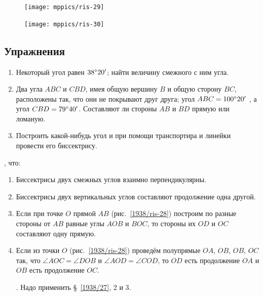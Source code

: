 \documentclass[oneside]{book}
\begin{document}
\begin{figure}
\begin{minipage}{.48\textwidth}
\centering
\texttt{[image: mppics/ris-29]}
\caption{}\label{1938/ris-29}
\end{minipage}\hfill
\begin{minipage}{.48\textwidth}
\centering
\texttt{[image: mppics/ris-30]}
\caption{}\label{1938/ris-30}
\end{minipage}
\end{figure}


\subsection*{Упражнения}

\begin{enumerate}

 \item
Некоторый угол равен $38\degree 20'$;
найти величину смежного с ним угла.

 \item
Два угла $ABC$ и $CBD$, имея общую вершину $B$ и общую сторону $BC$, расположены так, что они не покрывают друг друга;
угол $ABC = 100\degree20'$ , а угол $CBD = 79\degree 40'$.
Составляют ли стороны $AB$ и $BD$ прямую или ломаную.

 \item
Построить какой-нибудь угол и при помощи транспортира и линейки провести его биссектрису.

\end{enumerate}

, что:

\begin{enumerate}[resume]
 \item
Биссектрисы двух смежных углов взаимно перпендикулярны.

 \item
Биссектрисы двух вертикальных углов составляют продолжение одна другой.

 \item
Если при точке $O$ прямой $AB$ (рис.~\ref{1938/ris-28}) построим по разные стороны от $AB$ равные углы $AOB$ и $BOC$, то стороны их $OD$ и $OC$ составляют одну прямую.

 \item
Если из точки $O$ (рис.~\ref{1938/ris-28}) проведём полупрямые $OA$, $OB$, $OB$, $OC$ так, что $\angle AOC = \angle DOB$ и $\angle AOD=\angle COD$, то $OD$ есть продолжение $OA$ и $OB$ есть продолжение $OC$.

.
Надо применить §~\ref{1938/27}, 2 и 3.

\end{enumerate}
\end{document}
